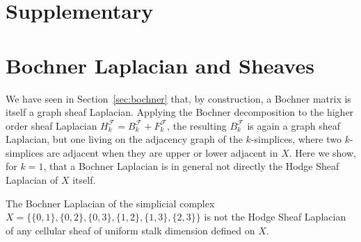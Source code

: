 \section*{Supplementary}

\section{Bochner Laplacian and Sheaves}
\label{sec:supplementary_bochner_sheaf}

We have seen in Section~\ref{sec:bochner} that, by construction, a Bochner
matrix is itself a graph sheaf Laplacian. Applying the Bochner decomposition to
the higher order sheaf Laplacian $H_k^{\mathcal F} = B_k^{\mathcal F} +
F_k^{\mathcal F}$, the resulting $B_k^{\mathcal F}$ is again a graph sheaf
Laplacian, but one living on the adjacency graph of the $k$-simplices, where
two $k$-simplices are adjacent when they are upper or lower adjacent in $X$.
Here we show, for $k=1$, that a Bochner Laplacian is in general not directly
the Hodge Sheaf Laplacian of $X$ itself.

\begin{proposition}
\label{prop:bochner_not_higher_order_sheaf}
The Bochner Laplacian of the simplicial complex
$X = \{\{0,1\},\{0,2\},\{0,3\},\{1,2\},\{1,3\},\{2,3\}\}$ is not the Hodge Sheaf
Laplacian of any cellular sheaf of uniform stalk dimension defined on $X$.
\end{proposition}


